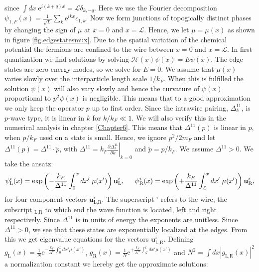 since $\int dx\; \text{e}^{i(k + q)x} =\mathcal{L} \delta_{k,-q} $. Here we use the Fourier decomposition $\psi_{1,F}(x) = \frac{1}{\sqrt{L}}\sum_k\text{e}^{ikx}c_{1,k}$. Now we form junctions of topogically distinct phases by changing the sign of $\mu$ at $x = 0$ and $x = \mathcal{L}$. Hence, we let $\mu = \mu(x)$ as shown in figure \ref{fig.edgestatesmux}. Due to the spatial variation of the chemical potential the fermions are confined to the wire between $x = 0$ and $x = \mathcal{L}$. In first quantization we find solutions by solving $\mathcal{H}(x)\psi(x) = E\psi(x)$. The edge states are zero energy modes, so we solve for $E = 0$. We assume that $\mu(x)$ varies slowly over the interparticle length scale $1/k_F$. When this is fulfilled the solution $\psi(x)$ will also vary slowly and hence the curvature of $\psi(x)$ proportional to $p^2\psi(x)$ is negligible. This means that to a good approximation we only keep the operator $p$ up to first order. Since the intrawire pairing, $\Delta^{11}_k$, is $p$-wave type, it is linear in $k$ for $k/k_F \ll 1$. We will also verify this in the numerical analysis in chapter \ref{Chapter6}. This means that $\Delta^{11}(p)$ is linear in $p$, when $p/k_F$ used on a state is small. Hence, we ignore $p^2/2m_F$ and let $\Delta^{11}(p) = \Delta^{11} \cdot \tilde{p}$, with $\Delta^{11} = k_F\left.\frac{\partial \Delta^{11}_k}{\partial k}\right|_{k=0}$ and $\tilde{p} = p/k_F$. We assume $\Delta^{11} > 0$. We take the ansatz:
\begin{equation}
\psi^{i}_{\text{L}}(x) = \exp\left(-\frac{k_F}{\Delta^{11}}\int_{0}^{x} dx'\; \mu(x') \right)\mathbf{u}^{i}_{\text{L}}, \hspace{0.5cm} \psi^{i}_{\text{R}}(x) = \exp\left(+\frac{k_F}{\Delta^{11}}\int_{\mathcal{L}}^{x} dx'\; \mu(x') \right)\mathbf{u}^{i}_{\text{R}}, \nonumber
\end{equation}  
for four component vectors $\mathbf{u}^{i}_{\text{L,R}}$. The superscript ${}^i$ refers to the wire, the subscript ${}_{\text{L,R}}$ to which end the wave function is located, left and right respectively. Since $\Delta^{11}$ is in units of energy the exponents are unitless. Since $\Delta^{11} > 0$, we see that these states are exponentially localized at the edges. From this we get eigenvalue equations for the vectors $\mathbf{u}^{i}_{\text{L,R}}$. Defining $g_\text{L}(x) = \frac{1}{N}\text{e}^{-\frac{k_F}{\Delta^{11}}\int_{0}^{x} dx' \mu(x')}$, $g_\text{R}(x) = \frac{1}{N}\text{e}^{+\frac{k_F}{\Delta^{11}}\int_{\mathcal{L}}^{x} dx' \mu(x')}$ and $N^2 = \int dx |g_{\text{L,R}}(x)|^2$ a normalization constant we hereby get the approximate solutions:
